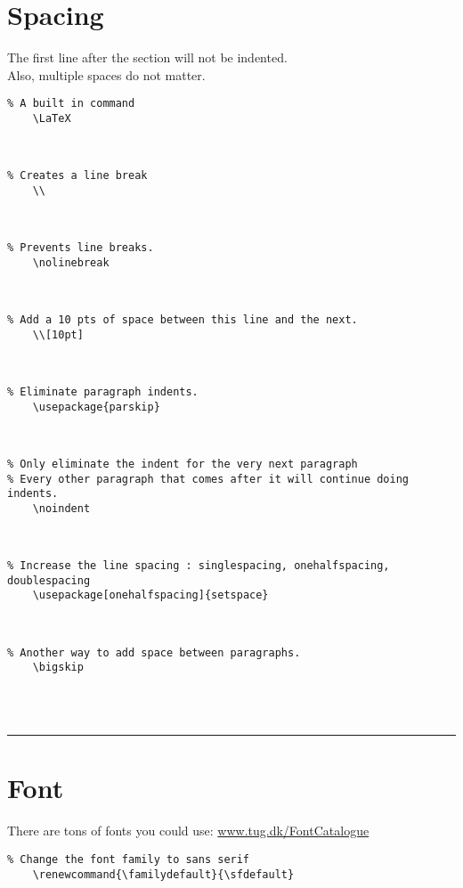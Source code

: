 \documentclass[a4paper,12pt,titlepage]{article}
\begin{document}
\section{Spacing}
The first line after the section will not be indented.
\\
Also, multiple spaces do not matter.
\\
\begin{lstlisting}
% A built in command
	\LaTeX
\end{lstlisting}
~\\
\begin{lstlisting}
% Creates a line break
	\\
\end{lstlisting}
~\\
\begin{lstlisting}
% Prevents line breaks.
	\nolinebreak
\end{lstlisting}
~\\
\begin{lstlisting}
% Add a 10 pts of space between this line and the next.
	\\[10pt]
\end{lstlisting}
~\\
\begin{lstlisting}
% Eliminate paragraph indents.
	\usepackage{parskip}
\end{lstlisting}
~\\
\begin{lstlisting}
% Only eliminate the indent for the very next paragraph
% Every other paragraph that comes after it will continue doing indents.
	\noindent
\end{lstlisting}
~\\
\begin{lstlisting}
% Increase the line spacing : singlespacing, onehalfspacing, doublespacing
	\usepackage[onehalfspacing]{setspace}
\end{lstlisting}
~\\
\begin{lstlisting}
% Another way to add space between paragraphs.
	\bigskip
\end{lstlisting}
~\\
\\
\rule{\linewidth}{0.1mm}






\section{Font}
There are tons of fonts you could use:
\url{www.tug.dk/FontCatalogue}
\\
\begin{lstlisting}
% Change the font family to sans serif
	\renewcommand{\familydefault}{\sfdefault}
\end{lstlisting}
\end{document}
